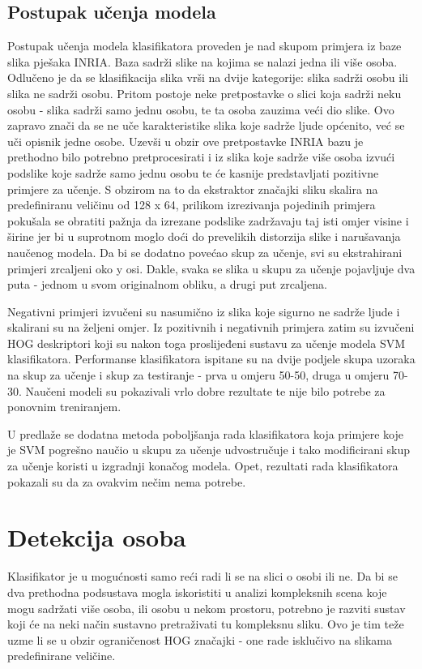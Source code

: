 \documentclass[utf8, seminar, numeric, times]{fer}
\begin{document}
\subsection{Postupak učenja modela}
Postupak učenja modela klasifikatora proveden je nad skupom primjera iz baze slika pješaka INRIA. Baza sadrži slike na kojima se nalazi jedna ili više osoba. Odlučeno je da se klasifikacija slika vrši na dvije kategorije: slika sadrži osobu ili slika ne sadrži osobu. Pritom postoje neke pretpostavke o slici koja sadrži neku osobu - slika sadrži samo jednu osobu, te ta osoba zauzima veći dio slike. Ovo zapravo znači da se ne uče karakteristike slika koje sadrže ljude općenito, već se uči opisnik jedne osobe. Uzevši u obzir ove pretpostavke INRIA bazu je prethodno bilo potrebno pretprocesirati i iz slika koje sadrže više osoba izvući podslike koje sadrže samo jednu osobu te će kasnije predstavljati pozitivne primjere za učenje. S obzirom na to da ekstraktor značajki sliku skalira na predefiniranu veličinu od 128 x 64, prilikom izrezivanja pojedinih primjera pokušala se obratiti pažnja da izrezane podslike zadržavaju taj isti omjer visine i širine jer bi u suprotnom moglo doći do prevelikih distorzija slike i narušavanja naučenog modela. Da bi se dodatno povećao skup za učenje, svi su ekstrahirani primjeri zrcaljeni oko y osi. Dakle, svaka se slika u skupu  za učenje pojavljuje dva puta - jednom u svom originalnom obliku, a drugi put zrcaljena.

Negativni primjeri izvučeni su nasumično iz slika koje sigurno ne sadrže ljude i skalirani su na željeni omjer. Iz pozitivnih i negativnih primjera zatim su izvučeni HOG deskriptori koji su nakon toga proslijeđeni sustavu za učenje modela SVM klasifikatora. Performanse klasifikatora ispitane su na dvije podjele skupa uzoraka na skup za učenje i skup za testiranje - prva u omjeru 50-50, druga u omjeru 70-30. Naučeni modeli su pokazivali vrlo dobre rezultate te nije bilo potrebe za ponovnim treniranjem.

U \cite{hog} predlaže se dodatna metoda poboljšanja rada klasifikatora koja primjere koje je SVM pogrešno naučio u skupu za učenje udvostručuje i tako modificirani skup za učenje koristi u izgradnji konačog modela. Opet, rezultati rada klasifikatora pokazali su da za ovakvim nečim nema potrebe.

\section{Detekcija osoba}
Klasifikator je u mogućnosti samo reći radi li se na slici o osobi ili ne. Da bi se dva prethodna podsustava mogla iskoristiti u analizi kompleksnih scena koje mogu sadržati više osoba, ili osobu u nekom prostoru, potrebno je razviti sustav koji će na neki način sustavno pretraživati tu kompleksnu sliku. Ovo je tim teže uzme li se u obzir ograničenost HOG značajki - one rade isklučivo na slikama predefinirane veličine.
\end{document}
